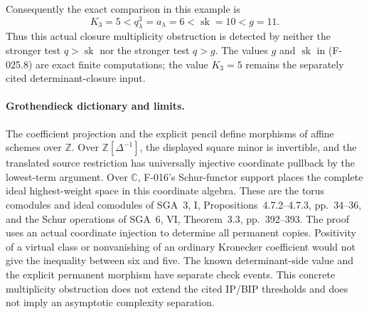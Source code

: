 Consequently the exact comparison in this example is
\[
             K_3=5<q^3_\lambda=a_\lambda=6
                          <\operatorname{sk}=10<g=11.
                                                               \tag{F-025.10}
\]
Thus this actual closure multiplicity obstruction is detected
by neither the stronger test \(q>\operatorname{sk}\) nor
the stronger test \(q>g\). The values \(g\) and
\(\operatorname{sk}\) in (F-025.8) are exact finite
computations; the value \(K_3=5\) remains the separately
cited determinant-closure input.

\paragraph{Grothendieck dictionary and limits.}
The coefficient projection and the explicit pencil define
morphisms of affine schemes over \(\mathbb Z\).
Over \(\mathbb Z[\Delta^{-1}]\), the displayed square
minor is invertible, and the translated source restriction
has universally injective coordinate pullback by the
lowest-term argument. Over \(\mathbb C\), F-016's
Schur-functor support places the complete ideal highest-weight
space in this coordinate algebra. These are the torus
comodules and ideal comodules of SGA~3, I,
Propositions~4.7.2--4.7.3, pp.~34--36, and the Schur
operations of SGA~6, VI, Theorem~3.3, pp.~392--393.
The proof uses an actual coordinate injection to determine
all permanent copies. Positivity of a virtual class or
nonvanishing of an ordinary Kronecker coefficient would
not give the inequality between six and five.
The known determinant-side value and the explicit permanent
morphism have separate check events. This concrete
multiplicity obstruction does not extend the cited IP/BIP
thresholds and does not imply an asymptotic complexity
separation.
